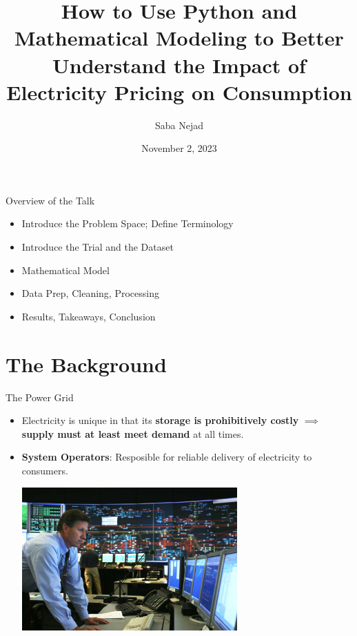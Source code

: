 \documentclass{beamer}
\title{How to Use Python and Mathematical Modeling to Better Understand the Impact of Electricity Pricing on Consumption}
\date{November 2, 2023}
\author{Saba Nejad}
\institute{PyData NYC 2023}
\begin{document}
\maketitle

\begin{frame}{Overview of the Talk}
  \begin{itemize}
  \item<+-> Introduce the Problem Space; Define Terminology
  \item<+-> Introduce the Trial and the Dataset
  \item<+-> Mathematical Model
  \item<+-> Data Prep, Cleaning, Processing
  \item<+-> Results, Takeaways, Conclusion
  \end{itemize}
\end{frame}

\section{The Background}

\begin{frame}{The Power Grid}
  \begin{itemize}
    \item<+-> Electricity is unique in that its \textbf{storage is prohibitively costly} $\implies$ \textbf{supply must at least meet demand} at all times. 
    \item<+-> \textbf{System Operators}: Resposible for reliable delivery of electricity to consumers.
    \vspace{0.2cm}
    \begin{center}
      \includegraphics[width=0.65\textwidth]{images/iso-control-room.png}
    \end{center}
  \end{itemize}
\end{frame}
\end{document}
